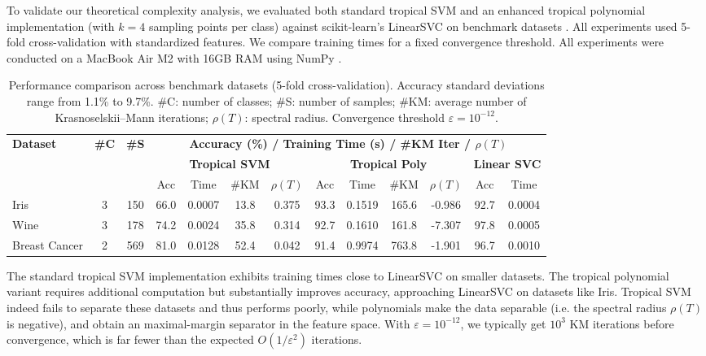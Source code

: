 \documentclass{article}
\begin{document}
To validate our theoretical complexity analysis, we evaluated both standard tropical SVM and an enhanced tropical polynomial implementation (with $k=4$ sampling points per class) against scikit-learn's LinearSVC on benchmark datasets \cite{scikit-learn}. All experiments used 5-fold cross-validation with standardized features. We compare training times for a fixed convergence threshold. All experiments were conducted on a MacBook Air M2 with 16GB RAM using NumPy \cite{harris2020array}.

\begin{table}[h]
    \centering
    \footnotesize
    \begin{tabular}{@{}l@{\hskip 4pt}c@{\hskip 4pt}c@{\hskip 8pt}ccc@{\hskip 4pt}c@{\hskip 8pt}cccc@{\hskip 8pt}cc@{}}
    \toprule
    \multirow{3}{*}{\textbf{Dataset}} & \multirow{3}{*}{\textbf{\#C}} & \multirow{3}{*}{\textbf{\#S}} & \multicolumn{10}{c}{\textbf{Accuracy (\%) / Training Time (s) / \#KM Iter / $\rho(T)$}} \\
    \cmidrule(lr){4-13}
    & & & \multicolumn{4}{c}{\textbf{Tropical SVM}} & \multicolumn{4}{c}{\textbf{Tropical Poly}} & \multicolumn{2}{c}{\textbf{Linear SVC}} \\
    \cmidrule(lr){4-7} \cmidrule(lr){8-11} \cmidrule(lr){12-13}
    & & & Acc & Time & \#KM & $\rho(T)$ & Acc & Time & \#KM & $\rho(T)$ & Acc & Time \\
    \midrule
    Iris & 3 & 150 & 66.0 & 0.0007 & 13.8 & 0.375 & 93.3 & 0.1519 & 165.6 & -0.986 & 92.7 & 0.0004 \\
    Wine & 3 & 178 & 74.2 & 0.0024 & 35.8 & 0.314 & 92.7 & 0.1610 & 161.8 & -7.307 & 97.8 & 0.0005 \\
    Breast Cancer & 2 & 569 & 81.0 & 0.0128 & 52.4 & 0.042 & 91.4 & 0.9974 & 763.8 & -1.901 & 96.7 & 0.0010 \\
    \bottomrule
    \end{tabular}
    \vspace{0.5em}
    \caption{Performance comparison across benchmark datasets (5-fold cross-validation). Accuracy standard deviations range from 1.1\% to 9.7\%. \#C: number of classes; \#S: number of samples; \#KM: average number of Krasnoselskii--Mann iterations; $\rho(T)$: spectral radius. Convergence threshold $\varepsilon = 10^{-12}$.}
    \label{tab:benchmark_results}
\end{table}


The standard tropical SVM implementation exhibits training times close to LinearSVC on smaller datasets. The tropical polynomial variant requires additional computation but substantially improves accuracy, approaching LinearSVC on datasets like Iris.
Tropical SVM indeed fails to separate these datasets and thus performs poorly, while polynomials make the data separable (i.e. the spectral radius $\rho(T)$ is negative), and obtain an maximal-margin separator in the feature space.
With $\varepsilon = 10^{-12}$, we typically get $10^3$ KM iterations before convergence, which is far fewer than the expected $O(1/\varepsilon^2)$ iterations.
\end{document}
